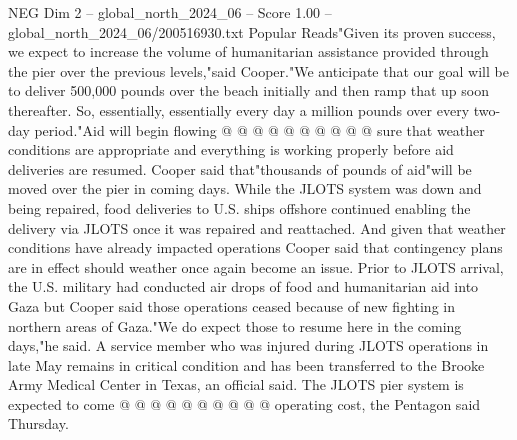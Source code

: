 \begin{textsample}{NEG Dim 2 – global\_north\_2024\_06 – Score 1.00 – global\_north\_2024\_06/200516930.txt}
Popular Reads"Given its proven success, we expect to increase the volume of humanitarian assistance provided through the pier over the previous levels,"said Cooper."We anticipate that our goal will be to deliver 500,000 pounds over the beach initially and then ramp that up soon thereafter.
So, essentially, essentially every day a million pounds over every two-day period."Aid will begin flowing @ @ @ @ @ @ @ @ @ @ sure that weather conditions are appropriate and everything is working properly before aid deliveries are resumed.
Cooper said that"thousands of pounds of aid"will be moved over the pier in coming days.
While the JLOTS system was down and being repaired, food deliveries to U.S. ships offshore continued enabling the delivery via JLOTS once it was repaired and reattached.
And given that weather conditions have already impacted operations Cooper said that contingency plans are in effect should weather once again become an issue.
Prior to JLOTS arrival, the U.S. military had conducted air drops of food and humanitarian aid into Gaza but Cooper said those operations ceased because of new fighting in northern areas of Gaza."We do expect those to resume here in the coming days,"he said.
A service member who was injured during JLOTS operations in late May remains in critical condition and has been transferred to the Brooke Army Medical Center in Texas, an official said.
The JLOTS pier system is expected to come @ @ @ @ @ @ @ @ @ @ operating cost, the Pentagon said Thursday.

\end{textsample}
